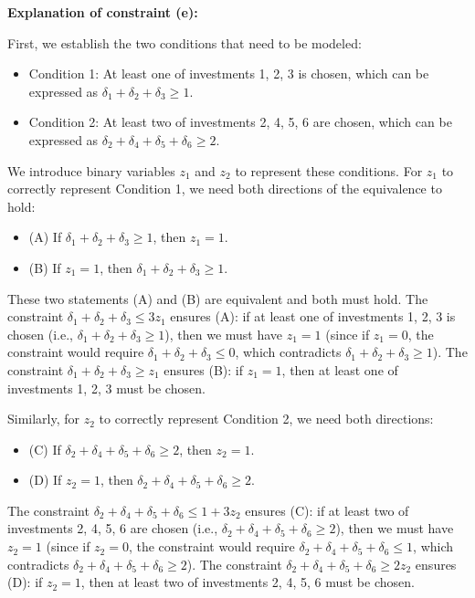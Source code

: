 \documentclass{article}
\begin{document}
\begin{enumerate}
\textbf{Explanation of constraint (e):}

First, we establish the two conditions that need to be modeled:
\begin{itemize}
    \item Condition 1: At least one of investments 1, 2, 3 is chosen, which can be expressed as $\delta_1 + \delta_2 + \delta_3 \geq 1$.
    \item Condition 2: At least two of investments 2, 4, 5, 6 are chosen, which can be expressed as $\delta_2 + \delta_4 + \delta_5 + \delta_6 \geq 2$.
\end{itemize}

We introduce binary variables $z_1$ and $z_2$ to represent these conditions. For $z_1$ to correctly represent Condition 1, we need both directions of the equivalence to hold:
\begin{itemize}
    \item (A) If $\delta_1 + \delta_2 + \delta_3 \geq 1$, then $z_1 = 1$.
    \item (B) If $z_1 = 1$, then $\delta_1 + \delta_2 + \delta_3 \geq 1$.
\end{itemize}

These two statements (A) and (B) are equivalent and both must hold. The constraint $\delta_1 + \delta_2 + \delta_3 \leq 3z_1$ ensures (A): if at least one of investments 1, 2, 3 is chosen (i.e., $\delta_1 + \delta_2 + \delta_3 \geq 1$), then we must have $z_1 = 1$ (since if $z_1 = 0$, the constraint would require $\delta_1 + \delta_2 + \delta_3 \leq 0$, which contradicts $\delta_1 + \delta_2 + \delta_3 \geq 1$). The constraint $\delta_1 + \delta_2 + \delta_3 \geq z_1$ ensures (B): if $z_1 = 1$, then at least one of investments 1, 2, 3 must be chosen.

Similarly, for $z_2$ to correctly represent Condition 2, we need both directions:
\begin{itemize}
    \item (C) If $\delta_2 + \delta_4 + \delta_5 + \delta_6 \geq 2$, then $z_2 = 1$.
    \item (D) If $z_2 = 1$, then $\delta_2 + \delta_4 + \delta_5 + \delta_6 \geq 2$.
\end{itemize}

The constraint $\delta_2 + \delta_4 + \delta_5 + \delta_6 \leq 1 + 3z_2$ ensures (C): if at least two of investments 2, 4, 5, 6 are chosen (i.e., $\delta_2 + \delta_4 + \delta_5 + \delta_6 \geq 2$), then we must have $z_2 = 1$ (since if $z_2 = 0$, the constraint would require $\delta_2 + \delta_4 + \delta_5 + \delta_6 \leq 1$, which contradicts $\delta_2 + \delta_4 + \delta_5 + \delta_6 \geq 2$). The constraint $\delta_2 + \delta_4 + \delta_5 + \delta_6 \geq 2z_2$ ensures (D): if $z_2 = 1$, then at least two of investments 2, 4, 5, 6 must be chosen.


\end{enumerate}
\end{document}
